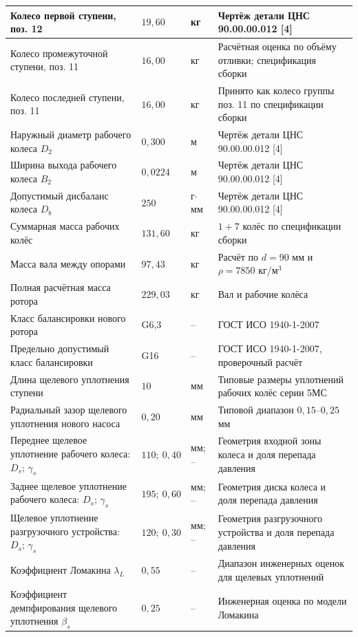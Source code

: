 \documentclass[14pt,a4paper]{extarticle}
\numberwithin{equation}{section}
\numberwithin{figure}{section}
\numberwithin{table}{section}
\begin{document}
\begin{longtable}{|p{}|p{}|p{}|p{}|}
\hline
Колесо первой ступени, поз. 12 & $19{,}60$ & кг & Чертёж детали ЦНС 90.00.00.012 [4] \\
\hline
Колесо промежуточной ступени, поз. 11 & $16{,}00$ & кг & Расчётная оценка по объёму отливки; спецификация сборки \\
\hline
Колесо последней ступени, поз. 11 & $16{,}00$ & кг & Принято как колесо группы поз. 11 по спецификации сборки \\
\hline
Наружный диаметр рабочего колеса $D_2$ & $0{,}300$ & м & Чертёж детали ЦНС 90.00.00.012 [4] \\
\hline
Ширина выхода рабочего колеса $B_2$ & $0{,}0224$ & м & Чертёж детали ЦНС 90.00.00.012 [4] \\
\hline
Допустимый дисбаланс колеса $D_b$ & $250$ & г$\cdot$мм & Чертёж детали ЦНС 90.00.00.012 [4] \\
\hline
Суммарная масса рабочих колёс & $131{,}60$ & кг & $1+7$ колёс по спецификации сборки \\
\hline
Масса вала между опорами & $97{,}43$ & кг & Расчёт по $d=90$ мм и $\rho=7850$ кг/м$^3$ \\
\hline
Полная расчётная масса ротора & $229{,}03$ & кг & Вал и рабочие колёса \\
\hline
Класс балансировки нового ротора & G6,3 & -- & ГОСТ ИСО 1940-1-2007 \\
\hline
Предельно допустимый класс балансировки & G16 & -- & ГОСТ ИСО 1940-1-2007, проверочный расчёт \\
\hline
Длина щелевого уплотнения ступени & $10$ & мм & Типовые размеры уплотнений рабочих колёс серии 5МС \\
\hline
Радиальный зазор щелевого уплотнения нового насоса & $0{,}20$ & мм & Типовой диапазон $0{,}15$--$0{,}25$ мм \\
\hline
Переднее щелевое уплотнение рабочего колеса: $D_s;\,\gamma_s$ & $110;\ 0{,}40$ & мм; -- & Геометрия входной зоны колеса и доля перепада давления \\
\hline
Заднее щелевое уплотнение рабочего колеса: $D_s;\,\gamma_s$ & $195;\ 0{,}60$ & мм; -- & Геометрия диска колеса и доля перепада давления \\
\hline
Щелевое уплотнение разгрузочного устройства: $D_s;\,\gamma_s$ & $120;\ 0{,}30$ & мм; -- & Геометрия разгрузочного устройства и доля перепада давления \\
\hline
Коэффициент Ломакина $\lambda_L$ & $0{,}55$ & -- & Диапазон инженерных оценок для щелевых уплотнений \\
\hline
Коэффициент демпфирования щелевого уплотнения $\beta_s$ & $0{,}25$ & -- & Инженерная оценка по модели Ломакина \\
\hline
\end{longtable}
\end{document}
